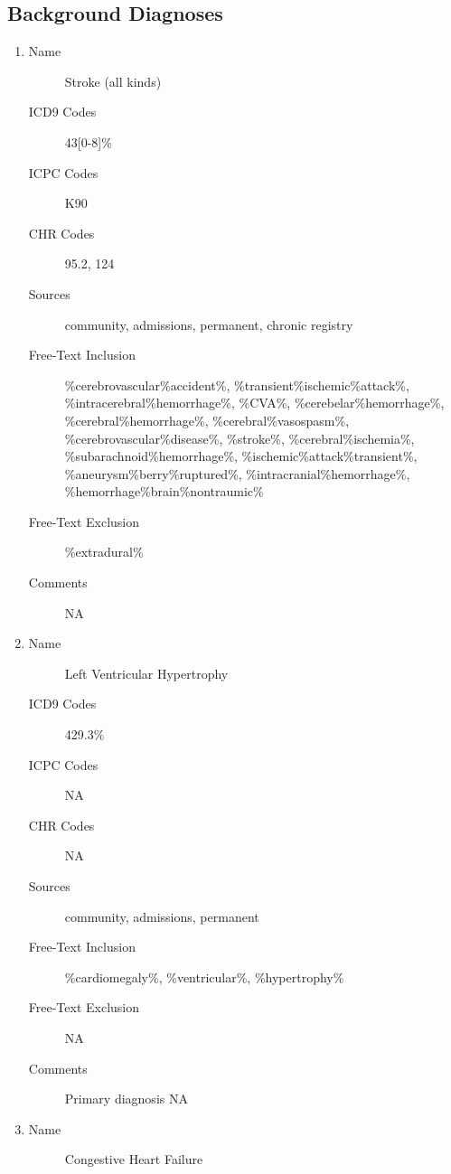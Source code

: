 \documentclass[a4paper,12pt]{article}
\begin{document}
\begin{appendices}
	   		\subsection{Background Diagnoses}
	   			\begin{enumerate}
	   				\item
	   				\begin{description}
	   					\item[Name] Stroke (all kinds)
	   					\item[ICD9 Codes] 43[0-8]\%
	   					\item[ICPC Codes] K90
	   					\item[CHR Codes] 95.2, 124
	   					\item[Sources] community, admissions, permanent, chronic registry
	   					\item[Free-Text Inclusion] \%cerebrovascular\%accident\%, \%transient\%ischemic\%attack\%, \%intracerebral\%hemorrhage\%, \%CVA\%, \%cerebelar\%hemorrhage\%, \%cerebral\%hemorrhage\%, \%cerebral\%vasospasm\%, \%cerebrovascular\%disease\%, \%stroke\%, \%cerebral\%ischemia\%, \%subarachnoid\%hemorrhage\%, \%ischemic\%attack\%transient\%, \%aneurysm\%berry\%ruptured\%, \%intracranial\%hemorrhage\%, \%hemorrhage\%brain\%nontraumic\%
	   					\item[Free-Text Exclusion] \%extradural\%
	   					\item[Comments] NA
	   				\end{description}
   					\item
   					\begin{description}
   						\item[Name] Left Ventricular Hypertrophy
   						\item[ICD9 Codes] 429.3\%
   						\item[ICPC Codes] NA
   						\item[CHR Codes] NA
   						\item[Sources] community, admissions, permanent
   						\item[Free-Text Inclusion] \%cardiomegaly\%, \%ventricular\%, \%hypertrophy\%
   						\item[Free-Text Exclusion] NA
   						\item[Comments] Primary diagnosis NA
   					\end{description}
   					\item
   					\begin{description}
   						\item[Name] Congestive Heart Failure

\end{description}
\end{enumerate}
\end{appendices}
\end{document}

